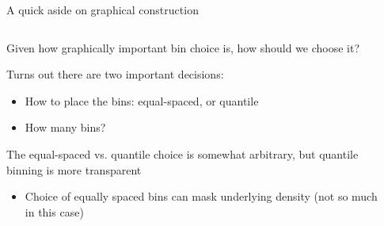 \documentclass[notes,11pt, aspectratio=169]{beamer}
\newenvironment{wideitemize}{\itemize\addtolength{\itemsep}{10pt}}{\enditemize}
\begin{document}
\begin{frame}{A quick aside on graphical construction}
  \begin{columns}[onlytextwidth, T] %
    \begin{column}{.5\textwidth}
      \begin{wideitemize}
      \item Given how graphically important bin choice is, how should
        we choose it?
      \item Turns out there are two important decisions:
        \begin{itemize}
        \item How to place the bins: equal-spaced, or quantile
        \item How many bins?
        \end{itemize}
      \item The equal-spaced vs. quantile choice is somewhat
        arbitrary, but quantile binning is more transparent
        \begin{itemize}
        \item Choice of equally spaced bins can mask underlying
          density (not so much in this case)
        \end{itemize}

      \end{wideitemize}
    \end{column}%
    \hfill%
    \begin{column}{.5\textwidth}
    \end{column}%
  \end{columns}
\end{frame}
\end{document}

